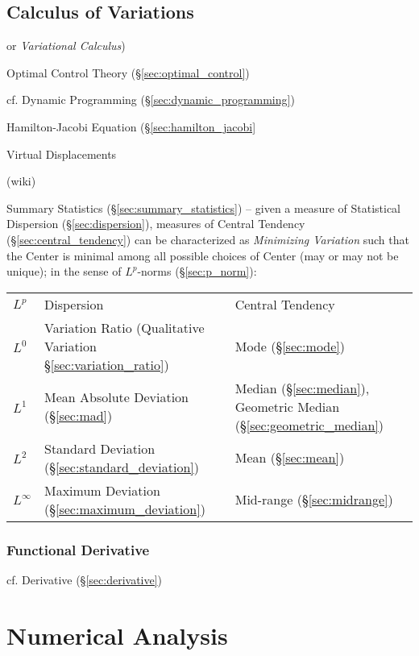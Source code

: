 \subsection{Calculus of Variations}\label{sec:calculus_of_variations}

or \emph{Variational Calculus})

\fist Optimal Control Theory (\S\ref{sec:optimal_control})

\fist cf. Dynamic Programming (\S\ref{sec:dynamic_programming})

Hamilton-Jacobi Equation (\S\ref{sec:hamilton_jacobi}

Virtual Displacements

(wiki)

 Summary Statistics (\S\ref{sec:summary_statistics}) -- given a measure of
 Statistical Dispersion (\S\ref{sec:dispersion}), measures of Central Tendency
 (\S\ref{sec:central_tendency}) can be characterized as \emph{Minimizing
   Variation} such that the Center is minimal among all possible choices of
 Center (may or may not be unique); in the sense of $L^p$-norms
 (\S\ref{sec:p_norm}):
\begin{tabular}{l l l}
  $L^p$ & Dispersion & Central Tendency \\
  $L^0$ & Variation Ratio (Qualitative Variation \S\ref{sec:variation_ratio})
    & Mode (\S\ref{sec:mode}) \\
  $L^1$ & Mean Absolute Deviation (\S\ref{sec:mad})
    & Median (\S\ref{sec:median}),
      Geometric Median (\S\ref{sec:geometric_median}) \\
  $L^2$ & Standard Deviation (\S\ref{sec:standard_deviation})
    & Mean (\S\ref{sec:mean}) \\
  $L^\infty$ & Maximum Deviation (\S\ref{sec:maximum_deviation})
    & Mid-range (\S\ref{sec:midrange})
\end{tabular}



\subsubsection{Functional Derivative}\label{sec:functional_derivative}

\fist cf. Derivative (\S\ref{sec:derivative})



\section{Numerical Analysis}\label{sec:numerical_analysis}


